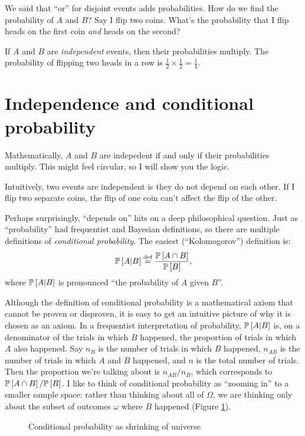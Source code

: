 We said that ``or'' for disjoint events adds probabilities. How do we
find the probability of $A$ and $B$? Say I flip two coins. What's the
probability that I flip heads on the first coin \emph{and} heads on the second?

If $A$ and $B$ are \emph{independent} events, then their probabilities
multiply. The probability of flipping two heads in a row is $\tfrac{1}{2} \times
\tfrac{1}{2} = \tfrac{1}{4}$.

\section{Independence and conditional probability}

Mathematically, $A$ and $B$ are indepedent if and only if their probabilities
multiply. This might feel circular, so I will show you the logic.

Intuitively, two events are independent is they do not depend on each other. If
I flip two separate coins, the flip of one coin can't affect the flip of the
other.

Perhaps surprisingly, ``depends on'' hits on a deep philosophical question.
Just as ``probability'' had frequentist and Bayesian definitions, so there are
multiple definitions of \emph{conditional probability}. The easiest
(``Kolomogorov'') definition is:
\begin{equation*}
\mathbb{P}\left[{A | B}\right] \stackrel{\text{def}}{=} \frac{\mathbb{P}\left[{A \cap B}\right]}{\mathbb{P}\left[{B}\right]},
\end{equation*}
where $\mathbb{P}\left[{A | B}\right]$ is pronounced ``the probability of $A$ given $B$''.

Although the definition of conditional probability is a mathematical axiom that
cannot be proven or disproven, it is easy to get an intuitive picture of why it
is chosen as an axiom. In a frequentist interpretation of probability, $\mathbb{P}\left[{A
| B}\right]$ is, on a denominator of the trials in which $B$ happened, the proportion
of trials in which $A$ also happened. Say $n_B$ is the number of trials in
which $B$ happened, $n_{AB}$ is the number of trials in which $A$ and $B$
happened, and $n$ is the total number of trials. Then the proportion we're
talking about is $n_{AB} / n_B$, which corresponds to $\mathbb{P}\left[{A \cap B}\right] /
\mathbb{P}\left[{B}\right]$. I like to think of conditional probability as ``zooming in'' to a
smaller sample space: rather than thinking about all of $\Omega$, we are
thinking only about the subset of outcomes $\omega$ where $B$ happened (Figure
\ref{fig:conditional-probability}).

\begin{figure}
\caption{Conditional probability as shrinking of universe}
\label{fig:conditional-probability}
\end{figure}

